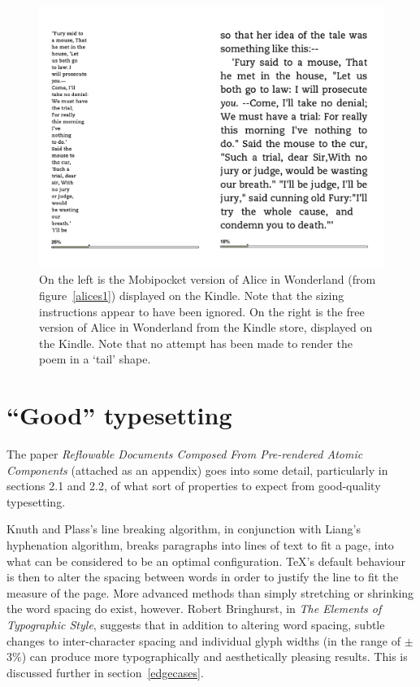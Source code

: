 \begin{figure}[tb]
\begin{center}
\vspace{-.3in}
\includegraphics[width=\textwidth]{gfx/alices2}
\end{center}
\vspace{-.3in}
\caption[The same document displayed on the Kindle]{On
the left is the Mobipocket version of Alice in Wonderland (from figure~\ref{alices1}) displayed on
the Kindle. Note that the sizing instructions appear to have been ignored. On the right is the free
version of Alice in Wonderland from the Kindle store, displayed on the Kindle. Note that no attempt
has been made to render the poem in a `tail' shape.}
\label{alices2}
\end{figure}

\section{``Good'' typesetting}
\label{goodtypesetting}
The paper \emph{Reflowable Documents Composed From Pre-rendered Atomic Components}\cite{Pinkney2011}
(attached as an appendix) goes into some detail, particularly in sections 2.1 and 2.2, of what sort
of properties to expect from good-quality typesetting.

Knuth and Plass's line breaking algorithm\cite{Knuth1981}, in conjunction with Liang's hyphenation
algorithm\cite{Liang1983}, breaks paragraphs into lines of text to fit a page, into what can be
considered to be an optimal configuration. \TeX 's default behaviour is then to alter the spacing
between words in order to justify the line to fit the measure of the page. More advanced methods
than simply stretching or shrinking the word spacing do exist, however. Robert Bringhurst, in
\emph{The Elements of Typographic Style}\cite{Bringhurst2008}, suggests that in addition to altering
word spacing, subtle changes to inter-character spacing and individual glyph widths (in the range of
$\pm$ 3\%) can produce more typographically and aesthetically pleasing results. This is discussed
further in section~\ref{edgecases}.




